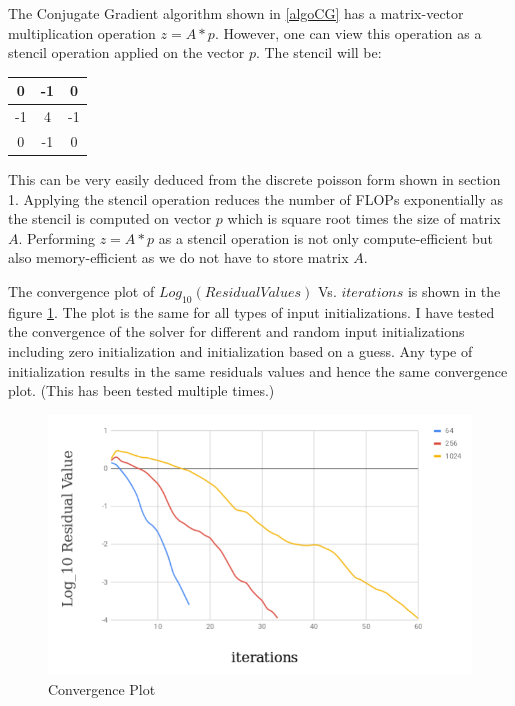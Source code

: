 \documentclass{article}
\begin{document}
\begin{spacing}{1.1}
The Conjugate Gradient algorithm shown in \eqref{algoCG} has a matrix-vector multiplication operation $z=A*p$. However, one can view this operation as a stencil operation applied on the vector $p$. The stencil will be:
\begin{tabular}{|c|c|c|}
\hline
0 & -1 & 0\\ \hline
-1 & 4 & -1 \\ \hline
0 & -1 & 0 \\ \hline
\end{tabular}

This can be very easily deduced from the discrete poisson form shown in section 1.
Applying the stencil operation reduces the number of FLOPs exponentially as the stencil is computed on vector $p$ which is square root times the size of matrix $A$.
Performing $z=A*p$ as a stencil operation is not only compute-efficient but also memory-efficient as we do not have to store matrix $A$.

The convergence plot of $Log_{10}(Residual Values)$ Vs. $iterations$ is shown in the figure \ref{convPlot}. The plot is the same for all types of input initializations. I have tested the convergence of the solver for different and random input initializations including zero initialization and initialization based on a guess. Any type of initialization results in the same residuals values and hence the same convergence plot. (This has been tested multiple times.)
\begin{center}
	\begin{figure}[H]
	\centering
       \includegraphics[scale=.40]{convergence.png}
        \caption{\label{convPlot} Convergence Plot} 
	\end{figure}
\end{center}



\end{spacing}
\end{document}
